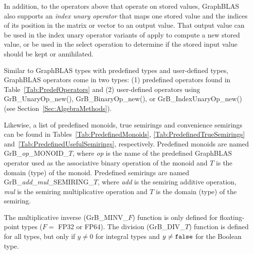 {\color{red}
In addition, to the operators above that operate on stored values, GraphBLAS
also supports an \emph{index unary operator} that maps one
stored value and the indices of its position in the matrix or vector to an output value.
That output value can be used in the index unary operator variants of apply to compute a
new stored value, or be used in the select operation to determine if the
stored input value should be kept or annihilated.
}

Similar to GraphBLAS types with predefined types and user-defined types,
GraphBLAS operators come in two types: (1) predefined operators found
in Table~\ref{Tab:PredefOperators} and (2) user-defined operators
using {\sf GrB\_UnaryOp\_new()}, {\sf GrB\_BinaryOp\_new()}, or 
{\sf GrB\_IndexUnaryOp\_new()} (see Section~\ref{Sec:AlgebraMethods}). 

Likewise, a list of predefined monoids, true semirings and convenience
semirings can be found in Tables~\ref{Tab:PredefinedMonoids},
\ref{Tab:PredefinedTrueSemirings} and~\ref{Tab:PredefinedUsefulSemirings},
respectively.  Predefined monoids are named {\sf
GrB\_\emph{op}\_MONOID\_$T$}, where \emph{op} is the name of the
predefined GraphBLAS operator used as the associative binary operation
of the monoid and $T$ is the domain (type) of the monoid.  Predefined
semirings are named {\sf GrB\_\emph{add}\_\emph{mul}\_SEMIRING\_$T$},
where \emph{add} is the semiring additive operation, \emph{mul} is
the semiring multiplicative operation and $T$ is the domain (type)
of the semiring.

The multiplicative inverse ({\sf GrB\_MINV\_$F$}) function is only defined
for floating-point types ($F = $ {\sf FP32} or {\sf FP64}).  The division
({\sf GrB\_DIV\_$T$}) function is defined for all types, but only if $y
\neq 0$ for integral types and $y \neq {\tt false}$ for the Boolean type.


